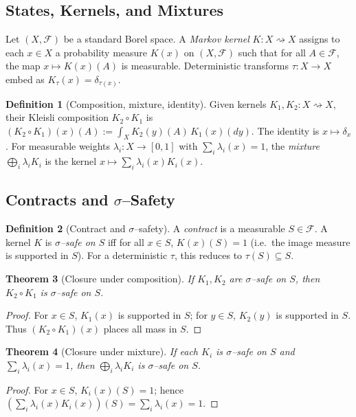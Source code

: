 \documentclass[11pt]{article}
\theoremstyle{definition}
\newtheorem{definition}{Definition}[section]
\theoremstyle{plain}
\newtheorem{theorem}[definition]{Theorem}
\theoremstyle{remark}
\newcommand{\X}{X}
\newcommand{\F}{\mathcal{F}}
\newcommand{\1}{\mathbf{1}}
\begin{document}
\subsection{States, Kernels, and Mixtures}
Let $(\X,\F)$ be a standard Borel space. A \emph{Markov kernel} $K:\X\rightsquigarrow \X$ assigns to each $x\in\X$ a probability measure $K(x)$ on $(\X,\F)$ such that for all $A\in\F$, the map $x\mapsto K(x)(A)$ is measurable. Deterministic transforms $\tau:\X\to \X$ embed as $K_\tau(x)=\delta_{\tau(x)}$.

\begin{definition}[Composition, mixture, identity]\label{def:ops}
Given kernels $K_1,K_2:\X\rightsquigarrow\X$, their Kleisli composition $K_2\circ K_1$ is $(K_2\circ K_1)(x)(A):=\int_{\X} K_2(y)(A)\,K_1(x)(dy)$. The identity is $x\mapsto \delta_x$. For measurable weights $\lambda_i:\X\to[0,1]$ with $\sum_i \lambda_i(x)=1$, the \emph{mixture} $\bigoplus_i \lambda_i K_i$ is the kernel $x\mapsto \sum_i \lambda_i(x) K_i(x)$.
\end{definition}

\subsection{Contracts and $\sigma$--Safety}
\begin{definition}[Contract and $\sigma$--safety]\label{def:sigma}
A \emph{contract} is a measurable $S\in\F$. A kernel $K$ is \emph{$\sigma$--safe on $S$} iff for all $x\in S$, $K(x)(S)=1$ (i.e.\ the image measure is supported in $S$). For a deterministic $\tau$, this reduces to $\tau(S)\subseteq S$.
\end{definition}

\begin{theorem}[Closure under composition]\label{thm:closure-comp}
If $K_1,K_2$ are $\sigma$--safe on $S$, then $K_2\circ K_1$ is $\sigma$--safe on $S$.
\end{theorem}
\begin{proof}
For $x\in S$, $K_1(x)$ is supported in $S$; for $y\in S$, $K_2(y)$ is supported in $S$. Thus $(K_2\circ K_1)(x)$ places all mass in $S$.
\end{proof}

\begin{theorem}[Closure under mixture]\label{thm:closure-mix}
If each $K_i$ is $\sigma$--safe on $S$ and $\sum_i\lambda_i(x)=1$, then $\bigoplus_i \lambda_i K_i$ is $\sigma$--safe on $S$.
\end{theorem}
\begin{proof}
For $x\in S$, $K_i(x)(S)=1$; hence $\left(\sum_i \lambda_i(x)K_i(x)\right)(S)=\sum_i\lambda_i(x) = 1$.
\end{proof}
\end{document}
